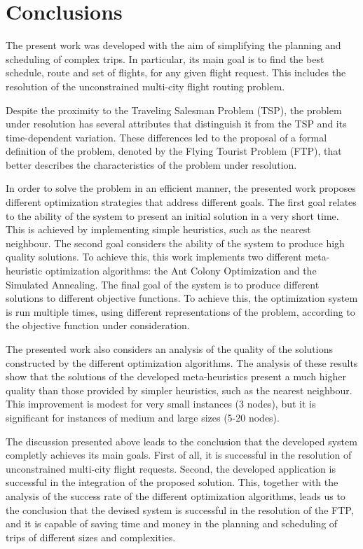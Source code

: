 % 
% 
% 
% 
\section{Conclusions}

The present work was developed with the aim of simplifying the planning and scheduling of complex trips. In particular, its main goal is to find the best schedule, route and set of flights, for any given flight request. This includes the resolution of the unconstrained multi-city flight routing problem.

Despite the proximity to the Traveling Salesman Problem (TSP), the problem under resolution has several attributes that distinguish it from the TSP and its time-dependent variation. These differences led to the proposal of a formal definition of the problem, denoted by the Flying Tourist Problem (FTP), that better describes the characteristics of the problem under resolution.

In order to solve the problem in an efficient manner, the presented work proposes different optimization strategies that address different goals. The first goal relates to the ability of the system to present an initial solution in a very short time. This is achieved by implementing simple heuristics, such as the nearest neighbour. The second goal considers the ability of the system to produce high quality solutions. To achieve this, this work implements two different meta-heuristic optimization algorithms: the Ant Colony Optimization and the Simulated Annealing. The final goal of the system is to produce different solutions to different objective functions. To achieve this, the optimization system is run multiple times, using different representations of the problem, according to the objective function under consideration.

The presented work also considers an analysis of the quality of the solutions constructed by the different optimization algorithms. The analysis of these results show that the solutions of the developed meta-heuristics present a much higher quality than those provided by simpler heuristics, such as the nearest neighbour. This improvement is modest for very small instances (3 nodes), but it is significant for instances of medium and large sizes (5-20 nodes). 

The discussion presented above leads to the conclusion that the developed system completly achieves its main goals. First of all, it is successful in the resolution of unconstrained multi-city flight requests. Second, the developed application is successful in the integration of the proposed solution.
This, together with the analysis of the success rate of the different optimization algorithms, leads us to the conclusion that the devised system is successful in the resolution of the FTP, and it is capable of saving time and money in the planning and scheduling of trips of different sizes and complexities.

